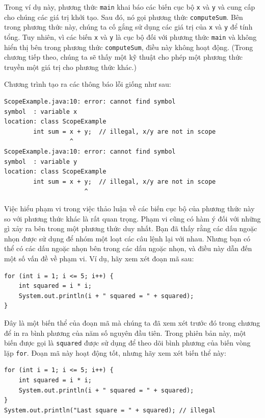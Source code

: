 Trong ví dụ này, phương thức \texttt{main} khai báo các biến cục bộ
\texttt{x} và \texttt{y} và cung cấp cho chúng các giá trị khởi tạo. Sau
đó, nó gọi phương thức \texttt{computeSum}. Bên trong phương thức này,
chúng ta cố gắng sử dụng các giá trị của \texttt{x} và \texttt{y} để
tính tổng. Tuy nhiên, vì các biến \texttt{x} và \texttt{y} là cục bộ đối
với phương thức \texttt{main} và không hiển thị bên trong phương thức
\texttt{computeSum}, điều này không hoạt động. (Trong chương tiếp theo,
chúng ta sẽ thấy một kỹ thuật cho phép một phương thức truyền một giá
trị cho phương thức khác.)

Chương trình tạo ra các thông báo lỗi giống như sau:

\begin{verbatim}
ScopeExample.java:10: error: cannot find symbol
symbol  : variable x
location: class ScopeExample
        int sum = x + y;  // illegal, x/y are not in scope
                  ^
ScopeExample.java:10: error: cannot find symbol
symbol  : variable y
location: class ScopeExample
        int sum = x + y;  // illegal, x/y are not in scope
                      ^
\end{verbatim}

Việc hiểu phạm vi trong việc thảo luận về các biến cục bộ của phương
thức này so với phương thức khác là rất quan trọng. Phạm vi cũng có hàm
ý đối với những gì xảy ra bên trong một phương thức duy nhất. Bạn đã
thấy rằng các dấu ngoặc nhọn được sử dụng để nhóm một loạt các câu lệnh
lại với nhau. Nhưng bạn có thể có các dấu ngoặc nhọn bên trong các dấu
ngoặc nhọn, và điều này dẫn đến một số vấn đề về phạm vi. Ví dụ, hãy xem
xét đoạn mã sau:

\begin{verbatim}
for (int i = 1; i <= 5; i++) {
    int squared = i * i;
    System.out.println(i + " squared = " + squared);
}
\end{verbatim}

Đây là một biến thể của đoạn mã mà chúng ta đã xem xét trước đó trong
chương để in ra bình phương của năm số nguyên đầu tiên. Trong phiên bản
này, một biến được gọi là \texttt{squared} được sử dụng để theo dõi bình
phương của biến vòng lặp \texttt{for}. Đoạn mã này hoạt động tốt, nhưng
hãy xem xét biến thể này:

\begin{verbatim}
for (int i = 1; i <= 5; i++) {
    int squared = i * i;
    System.out.println(i + " squared = " + squared);
}
System.out.println("Last square = " + squared); // illegal
\end{verbatim}

